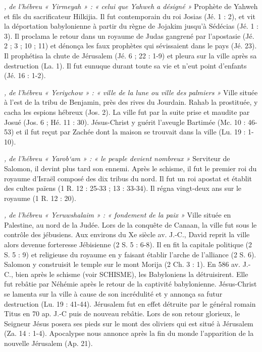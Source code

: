 \begin{multicols}{2}
\textit{, de l'hébreu « Yirmeyah » : « celui que Yahweh a désigné »}\newline
Prophète de Yahweh et fils du sacrificateur Hilkijia. Il fut contemporain du roi Josias (Jé. 1 : 2), et vit la déportation babylonienne à partir du règne de Jojakim jusqu'à Sédécias (Jé. 1 : 3). Il proclama le retour dans un royaume de Judas gangrené par l'apostasie (Jé. 2 ; 3 ; 10 ; 11) et dénonça les faux prophètes qui sévissaient dans le pays (Jé. 23). Il prophétisa la chute de Jérusalem (Jé. 6 ; 22 : 1-9) et pleura sur la ville après sa destruction (La. 1). Il fut eunuque durant toute sa vie et n'eut point d'enfants (Jé. 16 : 1-2).

\textit{, de l'hébreu « Yeriychow » : « ville de la lune ou ville des palmiers »}\newline
Ville située à l'est de la tribu de Benjamin, près des rives du Jourdain.
Rahab la prostituée, y cacha les espions hébreux (Jos. 2). La ville fut par la suite prise et maudite par Josué (Jos. 6 ; Hé. 11 : 30). Jésus-Christ y guérit l'aveugle Bartimée (Mc. 10 : 46-53) et il fut reçut par Zachée dont la maison se trouvait dans la ville (Lu. 19 : 1-10).

\textit{, de l'hébreu « Yarob`am » : « le peuple devient nombreux »}\newline
Serviteur de Salomon, il devint plus tard son ennemi. Après le schisme, il fut le premier roi du royaume d'Israël composé des dix tribus du nord. Il fut un roi apostat et établit des cultes païens (1 R. 12 : 25-33 ; 13 : 33-34). Il régna vingt-deux ans sur le royaume (1 R. 12 : 20).

\textit{, de l'hébreu « Yeruwshalaim » : « fondement de la paix »}\newline
Ville située en Palestine, au nord de la Judée. Lors de la conquête de Canaan, la ville fut sous le contrôle des jébusiens. Aux environs du Xe siècle av. J.-C., David reprit la ville alors devenue forteresse Jébisienne (2 S. 5 : 6-8). Il en fit la capitale politique (2 S. 5 : 9) et religieuse du royaume en y faisant établir l'arche de l'alliance (2 S. 6). Salomon y construisit le temple sur le mont Morija (2 Ch. 3 : 1). En 586 av. J.-C., bien après le schisme (voir SCHISME), les Babyloniens la détruisirent. Elle fut rebâtie par Néhémie après le retour de la captivité babylonienne. Jésus-Christ se lamenta sur la ville à cause de son incrédulité et y annonça sa futur destruction (Lu. 19 : 41-44). Jérusalem fut en effet détruite par le général romain Titus en 70 ap. J.-C puis de nouveau rebâtie. Lors de son retour glorieux, le Seigneur Jésus posera ses pieds sur le mont des oliviers qui est situé à Jérusalem (Za. 14 : 1-4). Apocalypse nous annonce après la fin du monde l'apparition de la nouvelle Jérusalem (Ap. 21).


\end{multicols}
